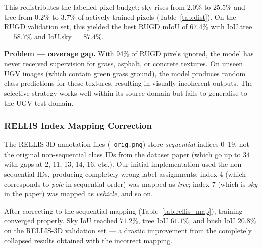 This redistributes the labelled pixel budget: sky rises from 2.0\% to
25.5\% and tree from 0.2\% to 3.7\% of actively trained pixels
(Table~\ref{tab:dist}).  On the RUGD validation set, this yielded the
best RUGD mIoU of $67.4\%$ with IoU.tree $= 58.7\%$ and IoU.sky $= 87.4\%$.

\textbf{Problem --- coverage gap.}  With 94\% of RUGD pixels ignored,
the model has never received supervision for grass, asphalt, or concrete
textures.  On unseen UGV images (which contain green grass ground), the
model produces random class predictions for these textures, resulting in
visually incoherent outputs.  The selective strategy works well within its
source domain but fails to generalise to the UGV test domain.

\subsubsection{RELLIS Index Mapping Correction}

The RELLIS-3D annotation files (\texttt{\_orig.png}) store
\emph{sequential} indices 0--19, not the original non-sequential class IDs
from the dataset paper (which go up to 34 with gaps at 2, 11, 13, 14,
16, etc.).  Our initial implementation used the non-sequential IDs,
producing completely wrong label assignments:
index 4 (which corresponds to \textit{pole} in sequential order) was
mapped as \textit{tree}; index 7 (which is \textit{sky} in the paper) was
mapped as \textit{vehicle}, and so on.

After correcting to the sequential mapping
(Table~\ref{tab:rellis_map}), training converged properly.  Sky IoU reached
$71.2\%$, tree IoU $61.1\%$, and bush IoU $20.8\%$ on the RELLIS-3D
validation set --- a drastic improvement from the completely collapsed
results obtained with the incorrect mapping.

